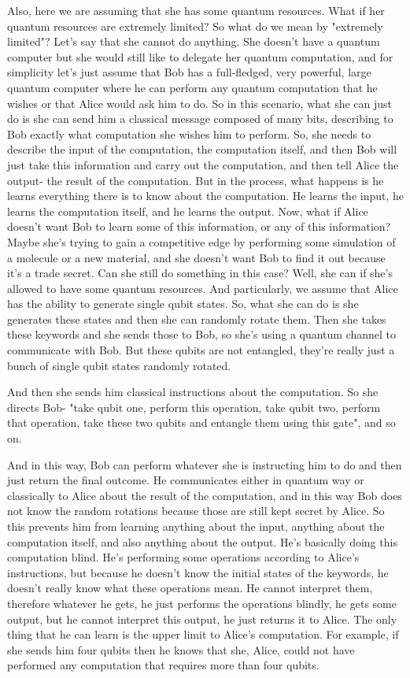 Also, here we are assuming that she has some quantum resources. What if her quantum resources are extremely limited? So what do we mean by "extremely limited"? Let's say that she cannot do anything. She doesn't have a quantum computer but she would still like to delegate her quantum computation, and for simplicity let's just assume that Bob has a full-fledged, very powerful, large quantum computer where he can perform any quantum computation that he wishes or that Alice would ask him to do. So in this scenario, what she can just do is she can send him a classical message composed of many bits, describing to Bob exactly what computation she wishes him to perform. So, she needs to describe the input of the computation, the computation itself, and then Bob will just take this information and carry out the computation, and then tell Alice the output- the result of the computation. But in the process, what happens is he learns everything there is to know about the computation. He learns the input, he learns the computation itself, and he learns the output. Now, what if Alice doesn't want Bob to learn some of this information, or any of this information? Maybe she's trying to gain a competitive edge by performing some simulation of a molecule or a new material, and she doesn't want Bob to find it out because it's a trade secret. Can she still do something in this case? Well, she can if she's allowed to have some quantum resources. And particularly, we assume that Alice has the ability to generate single qubit states. So, what she can do is she generates these states and then she can randomly rotate them. Then she takes these keywords and she sends those to Bob, so she's using a quantum channel to communicate with Bob. But these qubits are not entangled, they're really just a bunch of single qubit states randomly rotated.

And then she sends him classical instructions about the computation. So she directs Bob- "take qubit one, perform this operation, take qubit two, perform that operation, take these two qubits and entangle them using this gate", and so on.

And in this way, Bob can perform whatever she is instructing him to do and then just return the final outcome. He communicates either in quantum way or classically to Alice about the result of the computation, and in this way Bob does not know the random rotations because those are still kept secret by Alice. So this prevents him from learning anything about the input, anything about the computation itself, and also anything about the output. He's basically doing this computation blind. He's performing some operations according to Alice's instructions, but because he doesn't know the initial states of the keywords, he doesn't really know what these operations mean. He cannot interpret them, therefore whatever he gets, he just performs the operations blindly, he gets some output, but he cannot interpret this output, he just returns it to Alice. The only thing that he can learn is the upper limit to Alice's computation. For example, if she sends him four qubits then he knows that she, Alice, could not have performed any computation that requires more than four qubits.




